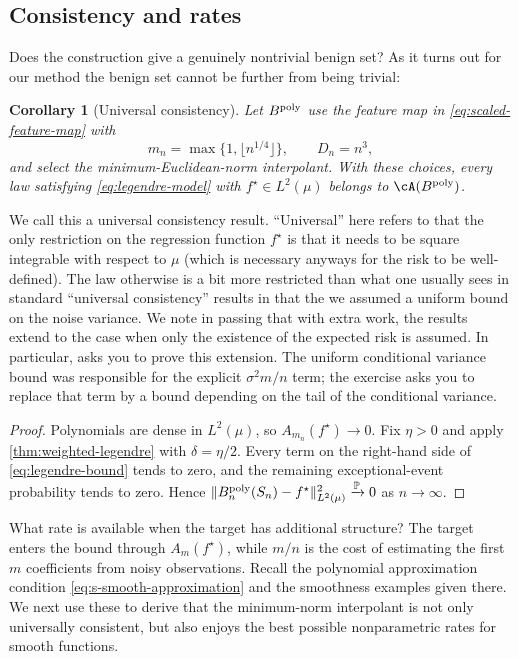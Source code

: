 \documentclass[11pt,twoside]{article}
\renewcommand{\P}{\mathbb P}
\newtheorem{corollary}[theorem]{Corollary}
\theoremstyle{definition}
\theoremstyle{remark}
\begin{document}
\subsection{Consistency and rates}

Does the construction give a genuinely nontrivial benign set? 
As it turns out for our method the benign set cannot be further from being trivial:

\begin{corollary}[Universal consistency]
\label{cor:polynomial-benign-class}
Let $B^{\rm poly}$ use the feature map in
\cref{eq:scaled-feature-map} with
\[
 m_n=\max\{1,\lfloor n^{1/4}\rfloor\},\qquad D_n=n^3,
\]
and select the minimum-Euclidean-norm interpolant. With these choices, every law satisfying
\cref{eq:legendre-model} with $f^\star\in L^2(\mu)$ belongs to
$\cA(B^{\rm poly})$.
\end{corollary}
We call this a universal consistency result. ``Universal'' here refers to that 
the only restriction on the regression function $f^\star$ is that it needs to be 
square integrable with respect to $\mu$ (which is necessary anyways for the risk to be well-defined).
The law otherwise is a bit more restricted than what one usually sees in standard ``universal consistency''
results in that the we assumed a uniform bound on the noise variance. We note in passing that
with extra work, the results extend to the case when only the existence of the expected
risk is assumed.
In particular,  asks you to prove this extension.
The uniform conditional variance bound was responsible for the explicit
$\sigma^2m/n$ term; the exercise asks you to replace that term by a bound
depending on the tail of the conditional variance.

\begin{proof}
Polynomials are dense in $L^2(\mu)$, so
$A_{m_n}(f^\star)\to0$. Fix $\eta>0$ and apply
\cref{thm:weighted-legendre} with $\delta=\eta/2$. Every term on the
right-hand side of \cref{eq:legendre-bound} tends to zero, and the remaining
exceptional-event probability tends to zero. Hence
$\|B_n^{\rm poly}(S_n)-f^\star\|_{L^2(\mu)}^2\xrightarrow{\P}0$ as
$n\to\infty$.
\end{proof}

What rate is available when the target has additional structure? 
The target
enters the bound through $A_m(f^\star)$, while $m/n$ is the cost of estimating
the first $m$ coefficients from noisy observations.
Recall the polynomial approximation condition
\cref{eq:s-smooth-approximation} and the smoothness examples given there.
We next use these to derive that the minimum-norm interpolant is not only 
universally consistent, but also enjoys the best possible nonparametric
rates for smooth functions.
\end{document}
